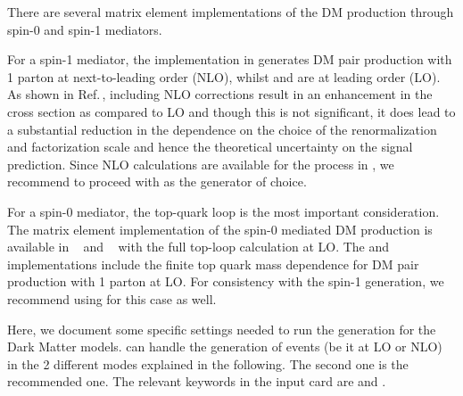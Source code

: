 

There are several matrix element implementations of the
DM production through spin-0 and spin-1 mediators.

For a spin-1 mediator, the implementation in \powheg generates
DM pair production with 1 parton at next-to-leading order (NLO), whilst \madgraph and \mcfm are at leading order (LO). As shown in \powheg Ref.\,\cite{Haisch:2013ata}, including NLO corrections result in an enhancement in the cross section as compared to LO and though this is not significant, it does lead to a substantial reduction in the dependence on the choice of the renormalization and factorization scale and hence the theoretical uncertainty on the signal prediction. 
Since NLO calculations are available for the process in \powheg, we recommend to proceed with \powheg as the generator of choice. 

For a spin-0 mediator, the top-quark loop is the most important
consideration.
The matrix element implementation of the \schannel spin-0 mediated DM production is available in \mcfm~\cite{Fox:2012ru,Harris:2014hga} and \powheg~\cite{Haisch:2015ioa} with the full top-loop calculation at LO.
The \powheg and \mcfm implementations include the finite
top quark mass dependence for DM pair production with 1 parton at LO.
For consistency with the spin-1 generation, we recommend using \powheg
for this case as well.

Here, we document some specific settings needed to run the \powheg 
generation for the Dark Matter models. \powheg can handle the generation of events (be it at LO or NLO) 
in the 2 different modes explained in the following. The second one 
is the recommended one. The relevant keywords in the input card are 
\bornsuppfact and \bornktmin. 

